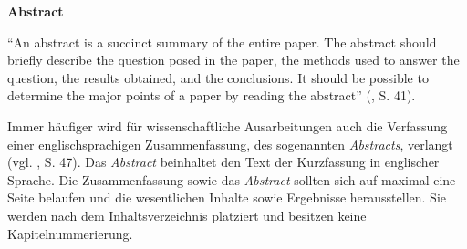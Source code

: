 \noindent
\textbf{\Large{Abstract}}

\vspace*{0.5 cm}

\noindent
"`An abstract is a succinct summary of the entire paper.
The abstract should briefly describe the question posed in the paper, the methods used to answer the question, the results obtained, and the conclusions.
It should be possible to determine the major points of a paper by reading the abstract"' (\cite{Karm2011}, S. 41).

Immer häufiger wird für wissenschaftliche Ausarbeitungen auch die Verfassung einer englischsprachigen Zusammenfassung, des sogenannten \textsl{Abstracts}, verlangt (vgl. \cite{Karm2011}, S. 47).
Das \textsl{Abstract} beinhaltet den Text der Kurzfassung in englischer Sprache.
Die Zusammenfassung sowie das \textsl{Abstract} sollten sich auf maximal eine Seite belaufen und die wesentlichen Inhalte sowie Ergebnisse herausstellen.
Sie werden nach dem Inhaltsverzeichnis platziert und besitzen keine Kapitelnummerierung.
